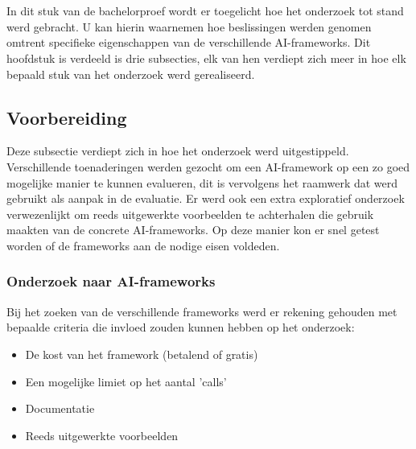 
\chapter{}
\label{ch:methodologie}


In dit stuk van de bachelorproef wordt er toegelicht hoe het onderzoek tot stand werd gebracht. U kan hierin waarnemen hoe beslissingen werden genomen omtrent specifieke eigenschappen van de verschillende AI-frameworks. Dit hoofdstuk is verdeeld is drie subsecties, elk van hen verdiept zich meer in hoe elk bepaald stuk van het onderzoek werd gerealiseerd.

\section{Voorbereiding}
Deze subsectie verdiept zich in hoe het onderzoek werd uitgestippeld. Verschillende toenaderingen werden gezocht om een AI-framework op een zo goed mogelijke manier te kunnen evalueren, dit is vervolgens het raamwerk dat werd gebruikt als aanpak in de evaluatie. Er werd ook een extra exploratief onderzoek verwezenlijkt om reeds uitgewerkte voorbeelden te achterhalen die gebruik maakten van de concrete AI-frameworks. Op deze manier kon er snel getest worden of de frameworks aan de nodige eisen voldeden.
\newpage

\subsection{ Onderzoek naar AI-frameworks}
Bij het zoeken van de verschillende frameworks werd er rekening gehouden met bepaalde criteria die invloed zouden kunnen hebben op het onderzoek:
\begin{itemize}
	\item De kost van het framework (betalend of gratis)
	\item Een mogelijke limiet op het aantal 'calls'
	\item Documentatie
	\item Reeds uitgewerkte voorbeelden
\end{itemize}

